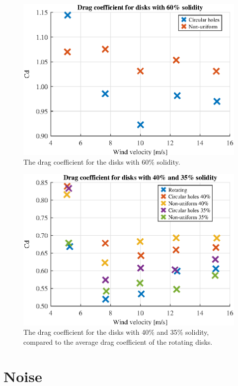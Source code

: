 \begin{figure}[h!]
    \centering
    \includegraphics[width=\linewidth]{0_Images/SixtyCD.eps}
    \caption{The drag coefficient for the disks with 60\% solidity.}
    \label{fig:RotationalAvg}
\end{figure}


\begin{figure}[h!]
    \centering
    \includegraphics[width=\linewidth]{0_Images/FortyCD.eps}
    \caption{The drag coefficient for the disks with 40\% and 35\% solidity, compared to the average drag coefficient of the rotating disks.}
    \label{fig:RotationalAvg}
\end{figure}


\section{Noise}






